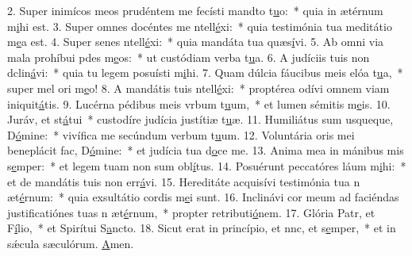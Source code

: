 2. Super inimícos meos prudéntem me fecísti mandto t\uline{u}o:~* quia in ætérnum m\uline{i}hi est.
3. Super omnes docéntes me ntell\uline{é}xi:~* quia testimónia tua meditátio m\uline{e}a est.
4. Super senes ntell\uline{é}xi:~* quia mandáta tua quæs\uline{í}vi.
5. Ab omni via mala prohíbui pdes m\uline{e}os:~* ut custódiam verba t\uline{u}a.
6. A judíciis tuis non dclin\uline{á}vi:~* quia tu legem posuísti m\uline{i}hi.
7. Quam dúlcia fáucibus meis elóa t\uline{u}a,~* super mel ori m\uline{e}o!
8. A mandátis tuis ntell\uline{é}xi:~* proptérea odívi omnem viam iniquit\uline{á}tis.
9. Lucérna pédibus meis vrbum t\uline{u}um,~* et lumen sémitis m\uline{e}is.
10. Juráv, et st\uline{á}tui~* custodíre judícia justítiæ t\uline{u}æ.
11. Humiliátus sum usqueque, D\uline{ó}mine:~* vivífica me secúndum verbum t\uline{u}um.
12. Voluntária oris mei beneplácit fac, D\uline{ó}mine:~* et judícia tua d\uline{o}ce me.
13. Anima mea in mánibus mis s\uline{e}mper:~* et legem tuam non sum obl\uline{í}tus.
14. Posuérunt peccatóres láum m\uline{i}hi:~* et de mandátis tuis non err\uline{á}vi.
15. Hereditáte acquisívi testimónia tua n æt\uline{é}rnum:~* quia exsultátio cordis m\uline{e}i sunt.
16. Inclinávi cor meum ad faciéndas justificatiónes tuas n æt\uline{é}rnum,~* propter retributi\uline{ó}nem.
17. Glória Patr, et F\uline{í}lio,~* et Spirítui S\uline{a}ncto.
18. Sicut erat in princípio, et nnc, et s\uline{e}mper,~* et in sǽcula sæculórum. \uline{A}men.
